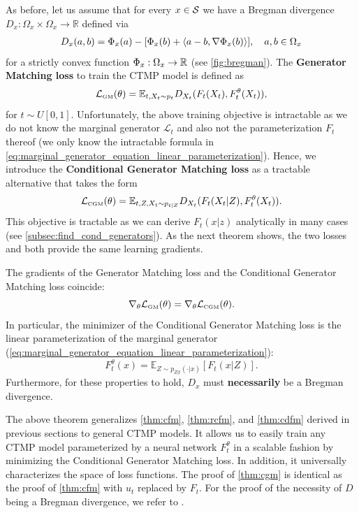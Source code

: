 \documentclass{fairmeta}
\newcommand{\highlight}[1]{{\color{metablue} \textbf{#1}}}
\renewcommand{\eqref}[1]{\labelcref{#1}}
\numberwithin{equation}{section}
\begin{document}
As before, let us assume that for every $x\in{\mathcal{S}}$ we have a Bregman divergence $D_{x}:\Omega_{x}\times\Omega_{x}\to\mathbb{R}$ defined via
\begin{align}
\label{eq:general_bregman_divergences}
    D_{x}(a,b)=\Phi_{x}(a) - [\Phi_{x}(b) +\left \langle a-b, \nabla \Phi_{x}(b) \right \rangle],\quad a,b\in \Omega_x
\end{align}
for a strictly convex function $\Phi_{x}:\Omega_{x}\to\mathbb{R}$ (see \cref{fig:bregman}). The \highlight{Generator Matching loss} to train the CTMP model is defined as
\begin{equation}\label{e:gm_loss}
    {\mathcal{L}}_{\scriptscriptstyle \text{GM}}(\theta) = \mathbb{E}_{t,X_t\sim p_t} D_{X_t}(F_t(X_t), F_t^\theta(X_t)),
\end{equation}
for $t\sim U[0,1]$. Unfortunately, the above training objective is intractable as we do not know the marginal generator $\mathcal{L}_t$ and also not the parameterization $F_t$ thereof (we only know the intractable formula in \cref{eq:marginal_generator_equation_linear_parameterization}). Hence, we introduce the \highlight{Conditional Generator Matching loss} as a tractable alternative that takes the form 
\begin{equation}\label{e:cgm_loss}
   {\mathcal{L}}_{\scriptscriptstyle \text{CGM}}(\theta) = \mathbb{E}_{t,Z, X_t\sim p_{t|Z}} D_{X_t}(F_t(X_t|Z), F_t^\theta(X_t)).
\end{equation}
This objective is tractable as we can derive $F_t(x|z)$ analytically in many cases (see \cref{subsec:find_cond_generators}). As the next theorem shows, the two losses  \eqref{e:gm_loss} and \eqref{e:cgm_loss} both provide the same learning gradients.

\begin{myframe}
\begin{theorem}\label{thm:cgm}
The gradients of the Generator Matching loss and the Conditional Generator Matching loss coincide:
\begin{equation}
        \nabla_\theta {\mathcal{L}}_{\scriptscriptstyle \text{GM}}(\theta) = \nabla_\theta {\mathcal{L}}_{\scriptscriptstyle \text{CGM}}(\theta).
    \end{equation}
    In particular, the minimizer of the Conditional Generator Matching loss is the linear parameterization of the marginal generator (\cref{eq:marginal_generator_equation_linear_parameterization}):
    \begin{equation}
        F_t^\theta(x) = \mathbb{E}_{Z\sim p_{Z|t}(\cdot|x)}[F_t(x|Z)].
    \end{equation}
Furthermore, for these properties to hold, $D_{x}$ must \highlight{necessarily} be a Bregman divergence.
\end{theorem}
\end{myframe}
The above theorem generalizes \cref{thm:cfm}, \cref{thm:rcfm}, and \cref{thm:cdfm}  derived in previous sections to general CTMP models. It allows us to easily train any CTMP model parameterized by a neural network $F_t^\theta$ in a scalable fashion by minimizing the Conditional Generator Matching loss. In addition, it universally characterizes the space of loss functions. The proof of \cref{thm:cgm} is identical as the proof of \cref{thm:cfm} with $u_t$ replaced by $F_t$. For the proof of the necessity of $D$ being a Bregman divergence, we refer to \citep{holderrieth2024gm}.
\end{document}

